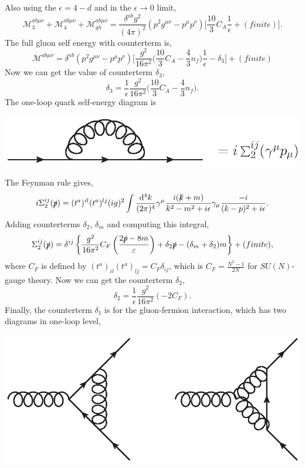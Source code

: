 \documentclass[a4paper,12pt]{article}
\renewcommand{\d}{\mathrm{d}}
\begin{document}
Also using the $\epsilon=4-d$ and in the $\epsilon\to 0$ limit,
\begin{equation}
    \mathcal{M}_{3}^{ab \mu \nu}+\mathcal{M}_{4}^{ab \mu \nu}+\mathcal{M}_{gh}^{ab \mu \nu}=\frac{\delta^{ab}g^2}{(4\pi)^2}(p^2g^{\mu \nu}-p^\mu p^\nu)\bigg[\frac{10}{3}C_A\frac{1}{\epsilon}+(finite)\bigg].
\end{equation}  
The full gluon self energy with counterterm is,
\begin{equation}
    \mathcal{M}^{ab \mu \nu}=\delta^{ab}(p^2g^{\mu \nu}-p^\mu p^\nu)\bigg[\frac{g^2}{16\pi^2}\bigg(\frac{10}{3}C_A-\frac{4}{3}n_f\bigg)\frac{1}{\epsilon}-\delta_3\bigg]+(finite)
\end{equation}
Now we can get the value of counterterm $\delta_3$,
\begin{equation}
    \delta_3=\frac{1}{\epsilon}\frac{g^2}{16\pi^2}\bigg(\frac{10}{3}C_A-\frac{4}{3}n_f\bigg).
\end{equation}
The one-loop quark self-energy diagram is
\begin{center}
\includegraphics{rgf/fse.eps}
\end{center}
The Feynman rule gives,
\begin{equation}
    i{\Sigma}_2^{ij}(\slashed p)=(t^a)^{il}(t^a)^{lj}(ig)^2\int\frac{\d^4k}{(2\pi)^4}\gamma^\mu \frac{i(\slashed k+m)}{k^2-m^2+i \epsilon}\gamma_\mu\frac{-i}{(k-p)^2+i \epsilon}.
\end{equation}
Adding counterterms $\delta_2$, $\delta_m$ and computing this integral,
\begin{equation}
    {\Sigma}_2^{ij}(\slashed p)=\delta^{ij}\left\{\frac{g^2}{16\pi^2}C_F\left(\frac{2\slashed{p}-8m}{\varepsilon}\right)+\delta_2\slashed p-(\delta_m+\delta_2)m\right\}+(finite),
\end{equation}  
where $C_F$ is defined by $(t^a)_{il}(t^a)_{lj}=C_F \delta_{ij}$, which is $C_F=\frac{N^2-1}{2N}$ for $SU(N)$-gauge theory. Now we can get the counterterm $\delta_2$,
\begin{equation}
    \delta_2=\frac{1}{\epsilon}\frac{g^2}{16\pi^2}(-2C_F).
\end{equation} 
Finally, the counterterm $\delta_1$ is for the gluon-fermion interaction, which has two diagrams in one-loop level,
\begin{center}
\includegraphics{rgf/3p.eps}
\end{center}
\end{document}
